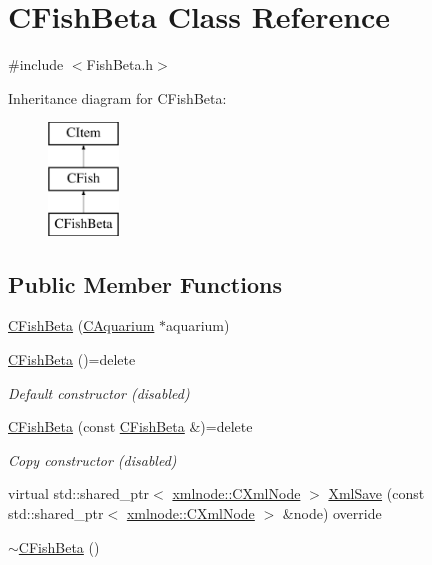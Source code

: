 \hypertarget{class_c_fish_beta}{}\section{C\+Fish\+Beta Class Reference}
\label{class_c_fish_beta}


{\ttfamily \#include $<$Fish\+Beta.\+h$>$}

Inheritance diagram for C\+Fish\+Beta\+:\begin{figure}[H]
\begin{center}
\leavevmode
\includegraphics[height=3.000000cm]{class_c_fish_beta}
\end{center}
\end{figure}
\subsection*{Public Member Functions}
\begin{DoxyCompactItemize}
\item 
\mbox{\hyperlink{class_c_fish_beta_a021073e2e0034271cd7e776b1e3fed29}{C\+Fish\+Beta}} (\mbox{\hyperlink{class_c_aquarium}{C\+Aquarium}} $\ast$aquarium)
\item 
\mbox{\label{class_c_fish_beta_a4e4d132618735adad44d04c9c40687ca}} 
\mbox{\hyperlink{class_c_fish_beta_a4e4d132618735adad44d04c9c40687ca}{C\+Fish\+Beta}} ()=delete
\begin{DoxyCompactList}\small\item\em Default constructor (disabled) \end{DoxyCompactList}\item 
\mbox{\label{class_c_fish_beta_adbf3559baac135dff393729c51b1ab31}} 
\mbox{\hyperlink{class_c_fish_beta_adbf3559baac135dff393729c51b1ab31}{C\+Fish\+Beta}} (const \mbox{\hyperlink{class_c_fish_beta}{C\+Fish\+Beta}} \&)=delete
\begin{DoxyCompactList}\small\item\em Copy constructor (disabled) \end{DoxyCompactList}\item 
virtual std\+::shared\+\_\+ptr$<$ \mbox{\hyperlink{classxmlnode_1_1_c_xml_node}{xmlnode\+::\+C\+Xml\+Node}} $>$ \mbox{\hyperlink{class_c_fish_beta_a0be2886a531ede77bfa5338fec71d71b}{Xml\+Save}} (const std\+::shared\+\_\+ptr$<$ \mbox{\hyperlink{classxmlnode_1_1_c_xml_node}{xmlnode\+::\+C\+Xml\+Node}} $>$ \&node) override
\item 
\mbox{\hyperlink{class_c_fish_beta_abd932894ad25a70f03c79c4f0f00fff4}{$\sim$\+C\+Fish\+Beta}} ()
\end{DoxyCompactItemize}
